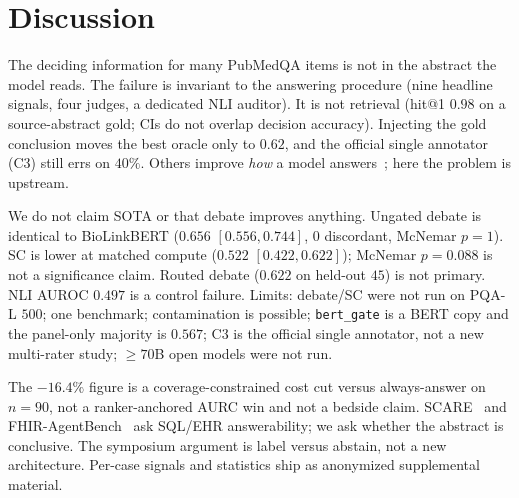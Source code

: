 \section{Discussion}
\label{sec:discussion}

The deciding information for many PubMedQA \maybe{} items is not in the
abstract the model reads. The failure is invariant to the answering
procedure (nine headline signals, four judges, a dedicated NLI auditor).
It is not retrieval (hit@1 $0.98$ on a source-abstract gold; CIs do not
overlap decision accuracy). Injecting the gold conclusion moves the best
oracle only to $0.62$, and the official single annotator (C3) still errs
on $40\%$. Others improve \emph{how} a model
answers~\citep{abdaljalil2026knowing,cocchieri2026llms,wynn2025talk};
here the problem is upstream.

We do not claim SOTA or that debate improves anything. Ungated debate is
identical to BioLinkBERT ($0.656$ $[0.556,0.744]$, $0$ discordant,
McNemar $p{=}1$). SC is lower at matched compute ($0.522$
$[0.422,0.622]$); McNemar $p{=}0.088$ is not a significance claim.
Routed debate ($0.622$ on held-out $45$) is not primary. NLI AUROC
$0.497$ is a control failure. Limits: debate/SC were not run on PQA-L
$500$; one benchmark; contamination is possible; \texttt{bert\_gate} is
a BERT copy and the panel-only majority is $0.567$; C3 is the official
single annotator, not a new multi-rater study; $\ge 70$B open models
were not run.

The $-16.4\%$ figure is a coverage-constrained cost cut versus
always-answer on $n{=}90$, not a ranker-anchored AURC win and not a
bedside claim. SCARE~\citep{lee2026scare} and
FHIR-AgentBench~\citep{lee2026fhir} ask SQL/EHR answerability; we ask
whether the abstract is conclusive. The symposium argument is label
versus abstain, not a new architecture. Per-case signals and statistics
ship as anonymized supplemental material.
